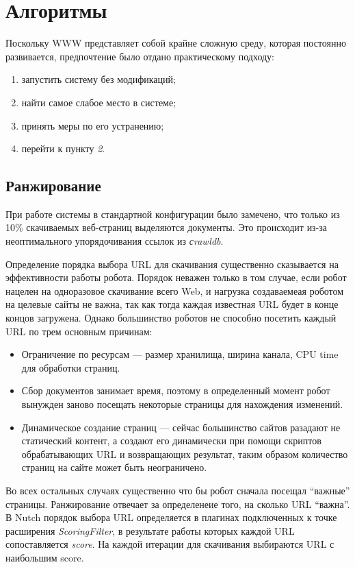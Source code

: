 \chapter{Алгоритмы}
Поскольку WWW представляет собой крайне сложную среду, которая постоянно развивается, предпочтение было отдано практическому подходу:
\begin{enumerate}
 \item запустить систему без модификаций;
 \item найти самое слабое место в системе;
 \item принять меры по его устранению;
 \item перейти к пункту \textit{2}.
\end{enumerate}
\section{Ранжирование}
При работе системы в стандартной конфигурации было замечено, что только из 10\% скачиваемых веб-страниц выделяются документы. Это происходит из-за неоптимального упорядочивания ссылок из \textit{сrawldb}.

Определение порядка выбора URL для скачивания существенно сказывается на эффективности работы робота.\cite{crawl}\cite{focused}\cite{opic} Порядок неважен только в том случае, если робот нацелен на одноразовое скачивание всего Web, и нагрузка создаваемеая роботом на целевые сайты не важна, так как тогда каждая известная URL будет в конце концов загружена. Однако большинство роботов не способно посетить каждый URL по трем основным причинам:
\begin{itemize}
 \item Ограничение по ресурсам --- размер хранилища, ширина канала, CPU time для обработки страниц.
 \item Сбор документов занимает время, поэтому в определенный момент робот вынужден заново посещать некоторые страницы для нахождения изменений.
 \item Динамическое создание страниц --- сейчас большинство сайтов разадают не статический контент, а создают его динамически при помощи скриптов обрабатывающих URL и возвращающих результат, таким образом количество страниц на сайте может быть неограничено.
\end{itemize}

Во всех остальных случаях существенно что бы робот сначала посещал ``важные'' страницы. Ранжирование отвечает за определенеие того, на сколько URL ``важна''.
В Nutch порядок выбора URL определяется в плагинах подключенных к точке расширения \textit{ScoringFilter}, в результате работы которых каждой URL сопоставляется \textit{score}. На каждой итерации для скачивания выбираются URL с наибольшим score.

